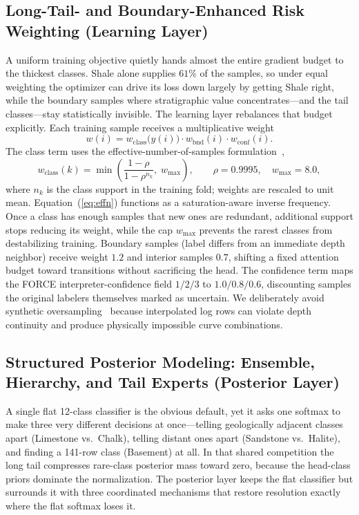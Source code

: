 \documentclass[bdcc,article,submit,pdftex,moreauthors]{Definitions/mdpi}
\begin{document}
\subsection{Long-Tail- and Boundary-Enhanced Risk Weighting (Learning Layer)}
\label{sec:learning}
A uniform training objective quietly hands almost the entire gradient budget to the thickest
classes. Shale alone supplies $61\%$ of the samples, so under equal weighting the optimizer
can drive its loss down largely by getting Shale right, while the boundary samples where
stratigraphic value concentrates---and the tail classes---stay statistically invisible. The
learning layer rebalances that budget explicitly. Each training sample receives a
multiplicative weight
\begin{equation}
w(i) = w_\text{class}\!\bigl(y(i)\bigr)\cdot w_\text{bnd}(i)\cdot w_\text{conf}(i).
\label{eq:weight}
\end{equation}
The class term uses the effective-number-of-samples
formulation~\cite{cui2019classbalanced},
\begin{equation}
w_\text{class}(k) = \min\!\left(\frac{1-\rho}{1-\rho^{n_k}},\; w_\text{max}\right),\qquad \rho=0.9995,\quad w_\text{max}=8.0,
\label{eq:effn}
\end{equation}
where $n_k$ is the class support in the training fold; weights are rescaled to unit mean.
Equation~(\ref{eq:effn}) functions as a saturation-aware inverse frequency. Once a class has
enough samples that new ones are redundant, additional support stops reducing its weight,
while the cap $w_\text{max}$ prevents the rarest classes from destabilizing training.
Boundary samples (label differs from an immediate depth neighbor) receive weight $1.2$ and
interior samples $0.7$, shifting a fixed attention budget toward transitions without
sacrificing the head. The confidence term maps the FORCE interpreter-confidence field
$1/2/3$ to $1.0/0.8/0.6$, discounting samples the original labelers themselves marked as
uncertain. We deliberately avoid synthetic oversampling~\cite{chawla2002smote} because interpolated
log rows can violate depth continuity and produce physically impossible curve combinations.

\subsection{Structured Posterior Modeling: Ensemble, Hierarchy, and Tail Experts (Posterior Layer)}
\label{sec:posterior}
A single flat 12-class classifier is the obvious default, yet it asks one softmax to make
three very different decisions at once---telling geologically adjacent classes apart
(Limestone vs.\ Chalk), telling distant ones apart (Sandstone vs.\ Halite), and finding a
141-row class (Basement) at all. In that shared competition the long tail compresses
rare-class posterior mass toward zero, because the head-class priors dominate the
normalization. The posterior layer keeps the flat classifier but surrounds it with three
coordinated mechanisms that restore resolution exactly where the flat softmax loses it.
\end{document}
